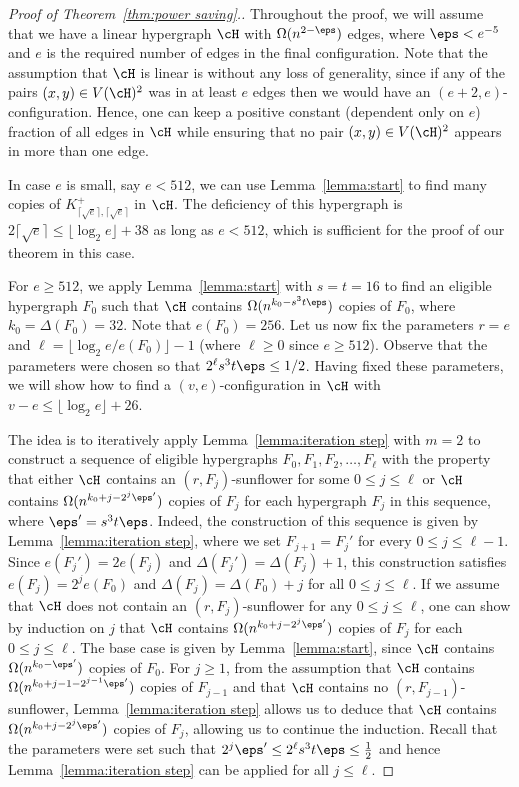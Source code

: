 \begin{proof}[Proof of Theorem~\ref{thm:power saving}.]
Throughout the proof, we will assume that we have a linear hypergraph $\cH$ with $\Omega(n^{2-\eps})$ edges, where $\eps<e^{-5}$ and $e$ is the required number of edges in the final configuration. Note that the assumption that $\cH$ is linear is without any loss of generality, since if any of the pairs $(x, y)\in V(\cH)^2$ was in at least $e$ edges then we would have an $(e+2, e)$-configuration. Hence, one can keep a positive constant (dependent only on $e$) fraction of all edges in $\cH$ while ensuring that no pair $(x, y)\in V(\cH)^2$ appears in more than one edge.

In case $e$ is small, say $e<512$, we can use Lemma~\ref{lemma:start} to find many copies of $K_{\lceil \sqrt{e}\rceil, \lceil \sqrt{e}\rceil}^{+}$ in $\cH$. The deficiency of this hypergraph is $2\lceil\sqrt{e}\rceil\leq \lfloor \log_2 e\rfloor +38$ as long as $e<512$, which is sufficient for the proof of our theorem in this case.

For $e\geq 512$, we apply Lemma~\ref{lemma:start} with $s=t=16$ to find an eligible hypergraph $F_0$ such that $\cH$ contains $\Omega(n^{k_0-s^3 t \eps})$ copies of $F_0$, where $k_0=\Delta(F_0) = 32$. Note that $e(F_0) = 256$. Let us now fix the parameters $r=e$ and $\ell=\lfloor \log_2 e/e(F_0)\rfloor-1$ (where $\ell\geq 0$ since $e\geq 512$). Observe that the parameters were chosen so that $2^\ell s^3t \eps\leq 1/2$. Having fixed these parameters, we will show how to find a $(v, e)$-configuration in $\cH$ with $v-e\leq \lfloor \log_2 e\rfloor +26$.

The idea is to iteratively apply Lemma~\ref{lemma:iteration step} with $m=2$ to construct a sequence of eligible hypergraphs $F_0, F_1, F_2, \dots, F_\ell$ with the property that either $\cH$ contains an $(r, F_j)$-sunflower for some $0\leq j\leq \ell$ or $\cH$ contains $\Omega(n^{k_0+j-2^j \eps'})$ copies of $F_j$ for each hypergraph $F_j$ in this sequence, where $\eps'=s^3t\eps$. Indeed, the construction of this sequence is given by Lemma~\ref{lemma:iteration step}, where we set $F_{j+1}=F_j'$ for every $0 \le j \le \ell-1$. Since $e(F_j')=2e(F_j)$ and $\Delta(F_j')=\Delta(F_j)+1$, this construction satisfies $e(F_j)=2^je(F_0)$ and $\Delta(F_j)=\Delta(F_0)+j$ for all $0 \le j \le \ell$.
If we assume that $\cH$ does not contain an $(r, F_j)$-sunflower for any $0\leq j\leq \ell$, one can show by induction on $j$ that $\cH$ contains $\Omega(n^{k_0+j-2^j \eps'})$ copies of $F_j$ for each $0\leq j\leq \ell$. The base case is given by Lemma~\ref{lemma:start}, since $\cH$ contains $\Omega(n^{k_0-\eps'})$ copies of $F_0$. For $j\ge 1$, from the assumption that $\cH$ contains $\Omega(n^{k_0+j-1-2^{j-1}\eps'})$ copies of $F_{j-1}$ and that $\cH$ contains no $(r, F_{j-1})$-sunflower, Lemma~\ref{lemma:iteration step} allows us to deduce that $\cH$ contains $\Omega(n^{k_0+j-2^j \eps'})$ copies of $F_j$, allowing us to continue the induction. Recall that the parameters were set such that $2^j \eps'\leq 2^\ell s^3 t\eps \leq \frac{1}{2}$ and hence Lemma~\ref{lemma:iteration step} can be applied for all $j\leq \ell$.


\end{proof}
